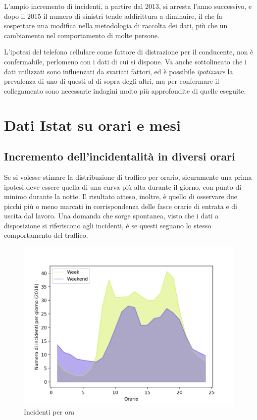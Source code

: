 \documentclass[a4paper,12pt]{report}
\newcommand{\quotestyle}[1]{\textit{#1}}
\begin{document}
L'ampio incremento di incidenti, a partire dal 2013, si arresta l'anno successivo, e dopo il 2015 
il numero di sinistri tende addirittura a diminuire, il che fa sospettare 
una modifica nella metodologia di raccolta dei dati, più che un cambiamento 
nel comportamento di molte persone. 

L'ipotesi del telefono cellulare come fattore di distrazione per il conducente, 
non è confermabile, perlomeno con i dati di cui si dispone. 
Va anche sottolineato che i dati utilizzati sono influenzati da svariati fattori, ed è 
possibile \quotestyle{ipotizzare} la prevalenza di uno di questi al di sopra degli altri, 
ma per confermare il collegamento sono necessarie indagini molto più approfondite di 
quelle eseguite. 

\section{Dati Istat su orari e mesi}

\subsection{Incremento dell'incidentalità in diversi orari}

Se si volesse stimare la distribuzione di traffico per orario, sicuramente una prima ipotesi 
deve essere quella di una curva più alta durante il giorno, con punto di minimo durante la notte. 
Il risultato atteso, inoltre, è quello di osservare due picchi più o meno marcati 
in corrispondenza delle fasce orarie di entrata e di uscita dal lavoro.
Una domanda che sorge spontanea, visto che i dati a disposizione si riferiscono agli incidenti, 
è se questi seguano lo stesso comportamento del traffico.

\begin{figure}
    \includegraphics[width=\linewidth]{../src/incidenti/incidenti_senza_coords/ore_punta/week_weekend.png}
    \caption{Incidenti per ora}
    \label{fig:week-weekend}
\end{figure}
\end{document}
